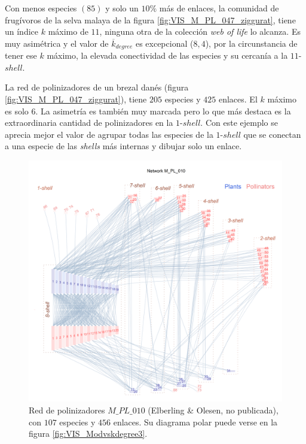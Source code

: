Con menos especies $(85)$ y solo un $10\%$ más de enlaces, la comunidad de frugívoros de la selva malaya de la figura \ref{fig:VIS_M_PL_047_ziggurat}, tiene un índice $k$ máximo de $11$, ninguna otra de la colección \textit{web of life} lo alcanza. Es muy asimétrica y el valor de $\overline k_{degree}$ es excepcional ($8,4$), por la circunstancia de tener ese $k$ máximo, la elevada conectividad de las especies y su cercanía a la $11$-$shell$.

La red de polinizadores de un brezal danés (figura \ref{fig:VIS_M_PL_047_ziggurat}), tiene $205$ especies y $425$ enlaces. El $k$ máximo es solo $6$. La asimetría es también muy marcada pero lo que más destaca es la extraordinaria cantidad de polinizadores en la $1$-$shell$. Con este ejemplo se aprecia mejor el valor de agrupar todas las especies de la $1$-$shell$ que se conectan a una especie de las \textit{shells} más internas y dibujar solo un enlace. 

\begin{figure}[ht!]
\centering
\includegraphics[scale=0.5]{Figures/VIS_M_PL_010_ziggurat.png}
\caption {Red de polinizadores $M\_PL\_010$ (Elberling \& Olesen, no publicada), con $107$ especies y $456$ enlaces. Su diagrama polar puede verse en la figura \ref{fig:VIS_Modvskdegree3}.}
\label{fig:VIS_M_PL_010_ziggurat}
\end{figure}

